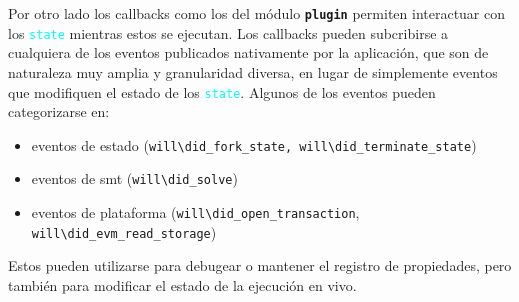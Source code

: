 Por otro lado los callbacks como los del módulo
\texttt{\textbf{plugin}} permiten interactuar con los \textcolor{cyan}{\texttt{state}} mientras estos se ejecutan.
Los callbacks pueden subcribirse a cualquiera de los eventos publicados nativamente por la aplicación, que son de naturaleza muy amplia y granularidad diversa, en lugar de simplemente eventos que modifiquen el estado de los \textcolor{cyan}{\texttt{state}}.
Algunos de los eventos pueden categorizarse en:
\begin{itemize}
    \item eventos de estado (\texttt{will\textbackslash did\_fork\_state, will\textbackslash did\_terminate\_state})
    \item eventos de smt (\texttt{will\textbackslash did\_solve})
    \item eventos de plataforma (\texttt{will\textbackslash did\_open\_transaction},\\ \texttt{will\textbackslash did\_evm\_read\_storage})
\end{itemize}
Estos pueden utilizarse para debugear o mantener el registro de propiedades, pero también para modificar el estado de la ejecución en vivo.


